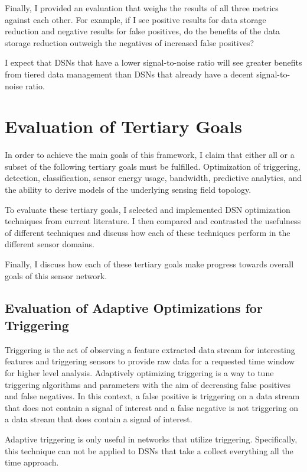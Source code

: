 Finally, I provided an evaluation that weighs the results of all three metrics against each other. For example, if I see positive results for data storage reduction and negative results for false positives, do the benefits of the data storage reduction outweigh the negatives of increased false positives?

I expect that DSNs that have a lower signal-to-noise ratio will see greater benefits from tiered data management than DSNs that already have a decent signal-to-noise ratio.

\section{Evaluation of Tertiary Goals}
In order to achieve the main goals of this framework, I claim that either all or a subset of the following tertiary goals must be fulfilled. Optimization of triggering, detection, classification, sensor energy usage, bandwidth, predictive analytics, and the ability to derive models of the underlying sensing field topology. 

To evaluate these tertiary goals, I selected and implemented DSN optimization techniques from current literature. I then compared and contrasted the usefulness of different techniques and discuss how each of these techniques perform in the different sensor domains.

Finally, I discuss how each of these tertiary goals make progress towards overall goals of this sensor network.

\subsection{Evaluation of Adaptive Optimizations for Triggering}
Triggering is the act of observing a feature extracted data stream for interesting features and triggering sensors to provide raw data for a requested time window for higher level analysis. Adaptively optimizing triggering is a way to tune triggering algorithms and parameters with the aim of decreasing false positives and false negatives. In this context, a false positive is triggering on a data stream that does not contain a signal of interest and a false negative is not triggering on a data stream that does contain a signal of interest. 

Adaptive triggering is only useful in networks that utilize triggering. Specifically, this technique can not be applied to DSNs that take a collect everything all the time approach.

